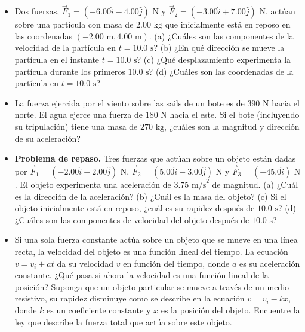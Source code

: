 \documentclass[11pt,a4paper]{article}
\begin{document}
\begin{itemize}
    \item[\textbf{5.}] Dos fuerzas, $\vec{F}_1 = (-6.00\hat{i} - 4.00\hat{j})\text{ N}$ y $\vec{F}_2 = (-3.00\hat{i} + 7.00\hat{j})\text{ N}$, actúan sobre una partícula con masa de $2.00 \text{ kg}$ que inicialmente está en reposo en las coordenadas $(-2.00 \text{ m}, 4.00 \text{ m})$. (a) ¿Cuáles son las componentes de la velocidad de la partícula en $t = 10.0 \text{ s}$? (b) ¿En qué dirección se mueve la partícula en el instante $t = 10.0 \text{ s}$? (c) ¿Qué desplazamiento experimenta la partícula durante los primeros $10.0 \text{ s}$? (d) ¿Cuáles son las coordenadas de la partícula en $t = 10.0 \text{ s}$?
    \vspace*{8cm}

    \item[\textbf{6.}] La fuerza ejercida por el viento sobre las sails de un bote es de $390 \text{ N}$ hacia el norte. El agua ejerce una fuerza de $180 \text{ N}$ hacia el este. Si el bote (incluyendo su tripulación) tiene una masa de $270 \text{ kg}$, ¿cuáles son la magnitud y dirección de su aceleración?
    \vspace*{6cm}

    \item[\textbf{7.}] \textbf{Problema de repaso.} Tres fuerzas que actúan sobre un objeto están dadas por $\vec{F}_1 = (-2.00\hat{i} + 2.00\hat{j})\text{ N}$, $\vec{F}_2 = (5.00\hat{i} - 3.00\hat{j})\text{ N}$ y $\vec{F}_3 = (-45.0\hat{i})\text{ N}$. El objeto experimenta una aceleración de $3.75 \text{ m/s}^2$ de magnitud. (a) ¿Cuál es la dirección de la aceleración? (b) ¿Cuál es la masa del objeto? (c) Si el objeto inicialmente está en reposo, ¿cuál es su rapidez después de $10.0 \text{ s}$? (d) ¿Cuáles son las componentes de velocidad del objeto después de $10.0 \text{ s}$?
    \vspace*{8cm}

    \item[\textbf{8.}] Si una sola fuerza constante actúa sobre un objeto que se mueve en una línea recta, la velocidad del objeto es una función lineal del tiempo. La ecuación $v = v_i + at$ da su velocidad $v$ en función del tiempo, donde $a$ es su aceleración constante. ¿Qué pasa si ahora la velocidad es una función lineal de la posición? Suponga que un objeto particular se mueve a través de un medio resistivo, su rapidez disminuye como se describe en la ecuación $v = v_i - kx$, donde $k$ es un coeficiente constante y $x$ es la posición del objeto. Encuentre la ley que describe la fuerza total que actúa sobre este objeto.
    \vspace*{6cm}
\end{itemize}
\end{document}
